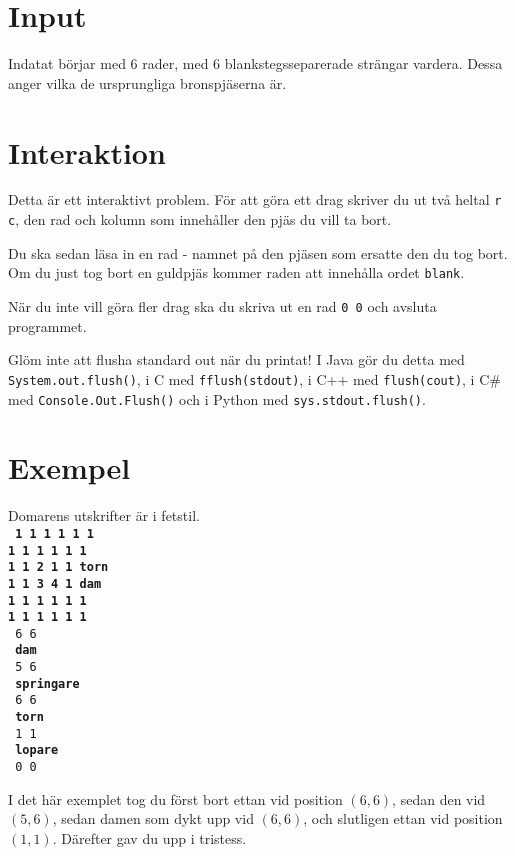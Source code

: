 \section*{Input}
Indatat börjar med 6 rader, med 6 blankstegsseparerade strängar vardera. Dessa anger vilka de ursprungliga
bronspjäserna är.

\section*{Interaktion}
Detta är ett interaktivt problem. För att göra ett drag skriver du ut två heltal \texttt{r c}, den rad och kolumn som
innehåller den pjäs du vill ta bort.

Du ska sedan läsa in en rad - namnet på den pjäsen som ersatte den du tog bort. Om du just tog bort en guldpjäs kommer raden att innehålla ordet \texttt{blank}.

När du inte vill göra fler drag ska du skriva ut en rad \texttt{0 0} och avsluta programmet.

Glöm inte att flusha standard out när du printat! I Java gör du detta med \texttt{System.out.flush()},
i C med \texttt{fflush(stdout)}, i C++ med \texttt{flush(cout)}, i C\# med \texttt{Console.Out.Flush()}
och i Python med \texttt{sys.stdout.flush()}.

\section*{Exempel}
Domarens utskrifter är i fetstil.\\
\textbf{\texttt{
1 1 1 1 1 1 \\
1 1 1 1 1 1 \\
1 1 2 1 1 torn \\
1 1 3 4 1 dam \\
1 1 1 1 1 1 \\
1 1 1 1 1 1 \\
}}
\texttt{
6 6 \\
}
\textbf{\texttt{
dam \\
}}
\texttt{
5 6 \\
}
\textbf{\texttt{
springare \\
}}
\texttt{
6 6 \\
}
\textbf{\texttt{
torn \\
}}
\texttt{
1 1 \\
}
\textbf{\texttt{
lopare \\
}}
\texttt{
0 0 \\
}

I det här exemplet tog du först bort ettan vid position $(6, 6)$, sedan den vid $(5, 6)$, sedan damen som dykt upp vid $(6, 6)$, och slutligen ettan vid position $(1, 1)$. Därefter gav du upp i tristess.

